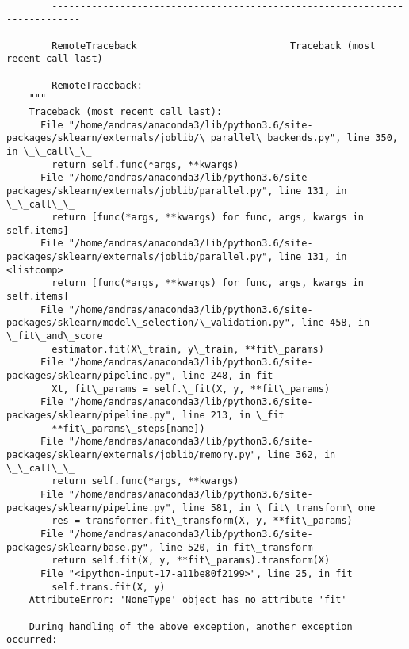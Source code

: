 \documentclass[11pt]{article}
\begin{document}
    \begin{Verbatim}[commandchars=\\\{\}]

        ---------------------------------------------------------------------------

        RemoteTraceback                           Traceback (most recent call last)

        RemoteTraceback: 
    """
    Traceback (most recent call last):
      File "/home/andras/anaconda3/lib/python3.6/site-packages/sklearn/externals/joblib/\_parallel\_backends.py", line 350, in \_\_call\_\_
        return self.func(*args, **kwargs)
      File "/home/andras/anaconda3/lib/python3.6/site-packages/sklearn/externals/joblib/parallel.py", line 131, in \_\_call\_\_
        return [func(*args, **kwargs) for func, args, kwargs in self.items]
      File "/home/andras/anaconda3/lib/python3.6/site-packages/sklearn/externals/joblib/parallel.py", line 131, in <listcomp>
        return [func(*args, **kwargs) for func, args, kwargs in self.items]
      File "/home/andras/anaconda3/lib/python3.6/site-packages/sklearn/model\_selection/\_validation.py", line 458, in \_fit\_and\_score
        estimator.fit(X\_train, y\_train, **fit\_params)
      File "/home/andras/anaconda3/lib/python3.6/site-packages/sklearn/pipeline.py", line 248, in fit
        Xt, fit\_params = self.\_fit(X, y, **fit\_params)
      File "/home/andras/anaconda3/lib/python3.6/site-packages/sklearn/pipeline.py", line 213, in \_fit
        **fit\_params\_steps[name])
      File "/home/andras/anaconda3/lib/python3.6/site-packages/sklearn/externals/joblib/memory.py", line 362, in \_\_call\_\_
        return self.func(*args, **kwargs)
      File "/home/andras/anaconda3/lib/python3.6/site-packages/sklearn/pipeline.py", line 581, in \_fit\_transform\_one
        res = transformer.fit\_transform(X, y, **fit\_params)
      File "/home/andras/anaconda3/lib/python3.6/site-packages/sklearn/base.py", line 520, in fit\_transform
        return self.fit(X, y, **fit\_params).transform(X)
      File "<ipython-input-17-a11be80f2199>", line 25, in fit
        self.trans.fit(X, y)
    AttributeError: 'NoneType' object has no attribute 'fit'
    
    During handling of the above exception, another exception occurred:
    

\end{Verbatim}
\end{document}

